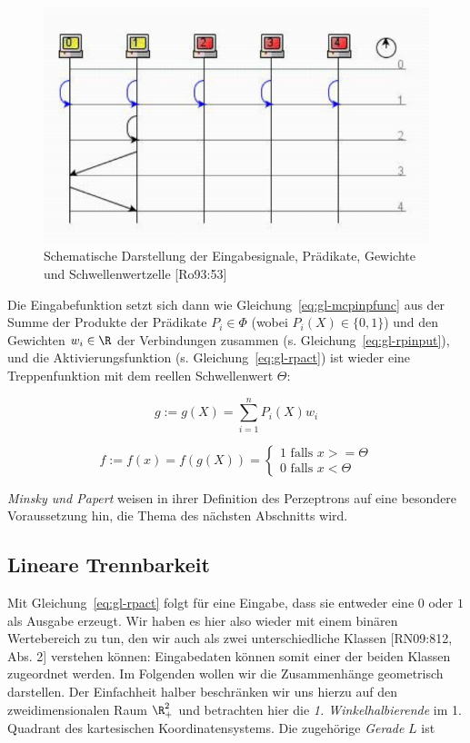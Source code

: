 \begin{figure}[h]
    \centering
    \includegraphics{images/p1ReadSeq.pdf}
    \caption{Schematische Darstellung der Eingabesignale, Prädikate, Gewichte und Schwellenwertzelle [Ro93:53]}
    \label{fig-perctheda}
\end{figure}


Die Eingabefunktion setzt sich dann wie Gleichung~\ref{eq:gl-mcpinpfunc} aus der Summe der Produkte der Prädikate $P_i \in \Phi$ (wobei $P_i(X) \in \{0, 1\}$) und den Gewichten $w_i \in \R$ der Verbindungen zusammen (s. Gleichung~\ref{eq:gl-rpinput}), und die Aktivierungsfunktion (s. Gleichung~\ref{eq:gl-rpact}) ist wieder eine Treppenfunktion mit dem reellen Schwellenwert $\Theta$:

\begin{equation}
g:= g(X) = \sum^n_{i=1} P_i(X) w_i
\label{eq:gl-rpinput}
\end{equation}

\begin{equation}
    f:= f(x) = f(g(X)) = \begin{cases}
                          1 \text{ falls } x >= \Theta \\
                          0 \text{ falls } x < \Theta
\end{cases}
\label{eq:gl-rpact}
\end{equation}

\noindent
\textit{Minsky und Papert} weisen in ihrer Definition des Perzeptrons auf eine besondere Voraussetzung hin, die Thema des nächsten Abschnitts wird.

\subsection{Lineare Trennbarkeit}
Mit Gleichung~\ref{eq:gl-rpact} folgt für eine Eingabe, dass sie entweder eine $0$ oder $1$ als Ausgabe erzeugt.
Wir haben es hier also wieder mit einem binären Wertebereich zu tun, den wir auch als zwei unterschiedliche Klassen [RN09:812, Abs. 2] verstehen können: Eingabedaten können somit einer der beiden Klassen zugeordnet werden.
Im Folgenden wollen wir die Zusammenhänge geometrisch darstellen.
Der Einfachheit halber beschränken wir uns hierzu auf den zweidimensionalen Raum $\R_+^2$ und betrachten hier die \textit{1. Winkelhalbierende} im 1. Quadrant des kartesischen Koordinatensystems.
Die zugehörige \textit{Gerade} $L$ ist

